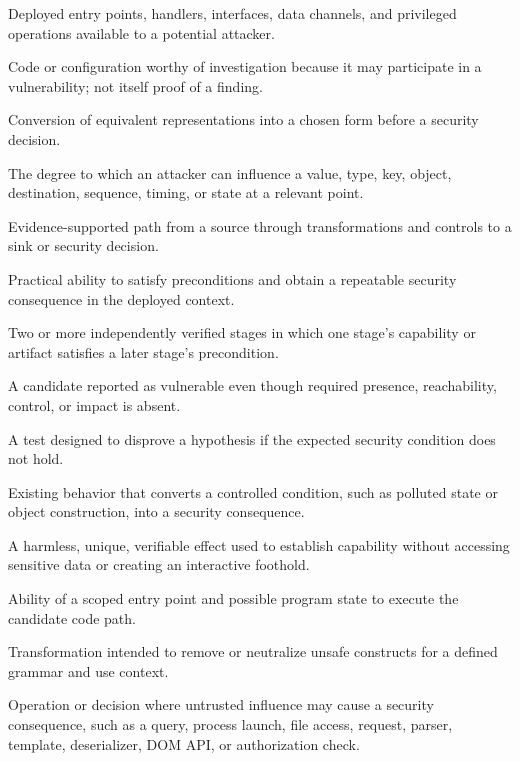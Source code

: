 \documentclass[11pt]{article}
\begin{document}
\begin{description}[style=nextline,leftmargin=1.5em,labelindent=0pt]
  \item[Attack surface] Deployed entry points, handlers, interfaces, data channels, and privileged operations available to a potential attacker.
  \item[Candidate point] Code or configuration worthy of investigation because it may participate in a vulnerability; not itself proof of a finding.
  \item[Canonicalization] Conversion of equivalent representations into a chosen form before a security decision.
  \item[Controllability] The degree to which an attacker can influence a value, type, key, object, destination, sequence, timing, or state at a relevant point.
  \item[Data-flow trace] Evidence-supported path from a source through transformations and controls to a sink or security decision.
  \item[Exploitability] Practical ability to satisfy preconditions and obtain a repeatable security consequence in the deployed context.
  \item[Exploit chain] Two or more independently verified stages in which one stage's capability or artifact satisfies a later stage's precondition.
  \item[False positive] A candidate reported as vulnerable even though required presence, reachability, control, or impact is absent.
  \item[Falsifying test] A test designed to disprove a hypothesis if the expected security condition does not hold.
  \item[Gadget] Existing behavior that converts a controlled condition, such as polluted state or object construction, into a security consequence.
  \item[Marker proof] A harmless, unique, verifiable effect used to establish capability without accessing sensitive data or creating an interactive foothold.
  \item[Reachability] Ability of a scoped entry point and possible program state to execute the candidate code path.
  \item[Sanitization] Transformation intended to remove or neutralize unsafe constructs for a defined grammar and use context.
  \item[Sink] Operation or decision where untrusted influence may cause a security consequence, such as a query, process launch, file access, request, parser, template, deserializer, DOM API, or authorization check.

\end{description}
\end{document}

